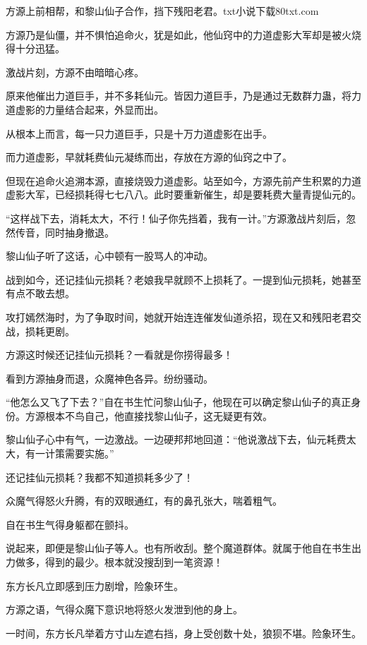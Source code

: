 
\begin{this_body}

方源上前相帮，和黎山仙子合作，挡下残阳老君。txt小说下载80txt.com

方源乃是仙僵，并不惧怕追命火，犹是如此，他仙窍中的力道虚影大军却是被火烧得十分迅猛。

激战片刻，方源不由暗暗心疼。

原来他催出力道巨手，并不多耗仙元。皆因力道巨手，乃是通过无数群力蛊，将力道虚影的力量结合起来，外显而出。

从根本上而言，每一只力道巨手，只是十万力道虚影在出手。

而力道虚影，早就耗费仙元凝练而出，存放在方源的仙窍之中了。

但现在追命火追溯本源，直接烧毁力道虚影。站至如今，方源先前产生积累的力道虚影大军，已经损耗得七七八八。此时要重新催生，却是要耗费大量青提仙元的。

“这样战下去，消耗太大，不行！仙子你先挡着，我有一计。”方源激战片刻后，忽然传音，同时抽身撤退。

黎山仙子听了这话，心中顿有一股骂人的冲动。

战到如今，还记挂仙元损耗？老娘我早就顾不上损耗了。一提到仙元损耗，她甚至有点不敢去想。

攻打嫣然海时，为了争取时间，她就开始连连催发仙道杀招，现在又和残阳老君交战，损耗更剧。

方源这时候还记挂仙元损耗？一看就是你捞得最多！

看到方源抽身而退，众魔神色各异。纷纷骚动。

“他怎么又飞了下去？”自在书生忙问黎山仙子，他现在可以确定黎山仙子的真正身份。方源根本不鸟自己，他直接找黎山仙子，这无疑更有效。

黎山仙子心中有气，一边激战。一边硬邦邦地回道：“他说激战下去，仙元耗费太大，有一计策需要实施。”

还记挂仙元损耗？我都不知道损耗多少了！

众魔气得怒火升腾，有的双眼通红，有的鼻孔张大，喘着粗气。

自在书生气得身躯都在颤抖。

说起来，即便是黎山仙子等人。也有所收刮。整个魔道群体。就属于他自在书生出力做多，得到的最少。根本就没搜刮到一笔资源！

东方长凡立即感到压力剧增，险象环生。

方源之语，气得众魔下意识地将怒火发泄到他的身上。

一时间，东方长凡举着方寸山左遮右挡，身上受创数十处，狼狈不堪。险象环生。


\end{this_body}
